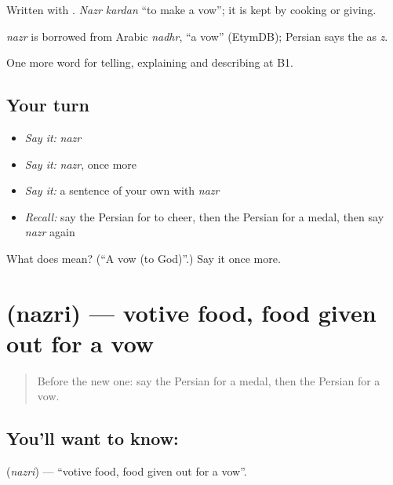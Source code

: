 Written with . \emph{Nazr kardan} \textquotedblleft{}to make a vow\textquotedblright{}; it is kept by cooking or giving.

\begin{cousinweb}
\emph{nazr} is borrowed from Arabic \emph{nadhr}, \textquotedblleft{}a vow\textquotedblright{} (EtymDB); Persian says the  as \emph{z}.
\end{cousinweb}

\begin{grammarlens}[title={What you've built}]
One more word for telling, explaining and describing at B1.
\end{grammarlens}

\subsection*{Your turn}
\begin{itemize}
\raggedright
  \item \emph{Say it:} \emph{nazr}
  \item \emph{Say it:} \emph{nazr}, once more
  \item \emph{Say it:} a sentence of your own with \emph{nazr}
  \item \emph{Recall:} say the Persian for to cheer, then the Persian for a medal, then say \emph{nazr} again
\end{itemize}

\begin{tcolorbox}[breakable,colback=teal!4,colframe=teal!35!black,title={Before you move on}]
What does  mean? (\textquotedblleft{}A vow (to God)\textquotedblright{}.) Say it once more.
\end{tcolorbox}
\section[\texorpdfstring{\fa{نذری} (nazri)}{نذری (nazri)}]{ (nazri) — votive food, food given out for a vow}

\label{lesson:FA-C344-nazri}



\begin{quote}
Before the new one: say the Persian for a medal, then the Persian for a vow.
\end{quote}

\subsection*{You'll want to know: }
\textbf{} (\emph{nazri}) — \textquotedblleft{}votive food, food given out for a vow\textquotedblright{}.

